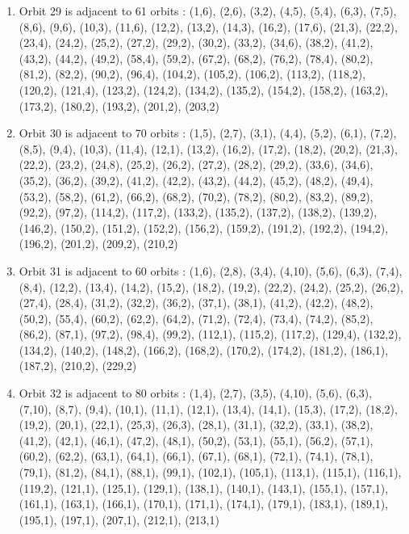 \documentclass[12pt]{article}
\begin{document}
\begin{enumerate}
\item Orbit 29 is adjacent to 61 orbits : (1,6), (2,6), (3,2), (4,5), (5,4), (6,3), (7,5), (8,6), (9,6), (10,3), (11,6), (12,2), (13,2), (14,3), (16,2), (17,6), (21,3), (22,2), (23,4), (24,2), (25,2), (27,2), (29,2), (30,2), (33,2), (34,6), (38,2), (41,2), (43,2), (44,2), (49,2), (58,4), (59,2), (67,2), (68,2), (76,2), (78,4), (80,2), (81,2), (82,2), (90,2), (96,4), (104,2), (105,2), (106,2), (113,2), (118,2), (120,2), (121,4), (123,2), (124,2), (134,2), (135,2), (154,2), (158,2), (163,2), (173,2), (180,2), (193,2), (201,2), (203,2)
\item Orbit 30 is adjacent to 70 orbits : (1,5), (2,7), (3,1), (4,4), (5,2), (6,1), (7,2), (8,5), (9,4), (10,3), (11,4), (12,1), (13,2), (16,2), (17,2), (18,2), (20,2), (21,3), (22,2), (23,2), (24,8), (25,2), (26,2), (27,2), (28,2), (29,2), (33,6), (34,6), (35,2), (36,2), (39,2), (41,2), (42,2), (43,2), (44,2), (45,2), (48,2), (49,4), (53,2), (58,2), (61,2), (66,2), (68,2), (70,2), (78,2), (80,2), (83,2), (89,2), (92,2), (97,2), (114,2), (117,2), (133,2), (135,2), (137,2), (138,2), (139,2), (146,2), (150,2), (151,2), (152,2), (156,2), (159,2), (191,2), (192,2), (194,2), (196,2), (201,2), (209,2), (210,2)
\item Orbit 31 is adjacent to 60 orbits : (1,6), (2,8), (3,4), (4,10), (5,6), (6,3), (7,4), (8,4), (12,2), (13,4), (14,2), (15,2), (18,2), (19,2), (22,2), (24,2), (25,2), (26,2), (27,4), (28,4), (31,2), (32,2), (36,2), (37,1), (38,1), (41,2), (42,2), (48,2), (50,2), (55,4), (60,2), (62,2), (64,2), (71,2), (72,4), (73,4), (74,2), (85,2), (86,2), (87,1), (97,2), (98,4), (99,2), (112,1), (115,2), (117,2), (129,4), (132,2), (134,2), (140,2), (148,2), (166,2), (168,2), (170,2), (174,2), (181,2), (186,1), (187,2), (210,2), (229,2)
\item Orbit 32 is adjacent to 80 orbits : (1,4), (2,7), (3,5), (4,10), (5,6), (6,3), (7,10), (8,7), (9,4), (10,1), (11,1), (12,1), (13,4), (14,1), (15,3), (17,2), (18,2), (19,2), (20,1), (22,1), (25,3), (26,3), (28,1), (31,1), (32,2), (33,1), (38,2), (41,2), (42,1), (46,1), (47,2), (48,1), (50,2), (53,1), (55,1), (56,2), (57,1), (60,2), (62,2), (63,1), (64,1), (66,1), (67,1), (68,1), (72,1), (74,1), (78,1), (79,1), (81,2), (84,1), (88,1), (99,1), (102,1), (105,1), (113,1), (115,1), (116,1), (119,2), (121,1), (125,1), (129,1), (138,1), (140,1), (143,1), (155,1), (157,1), (161,1), (163,1), (166,1), (170,1), (171,1), (174,1), (179,1), (183,1), (189,1), (195,1), (197,1), (207,1), (212,1), (213,1)

\end{enumerate}
\end{document}
